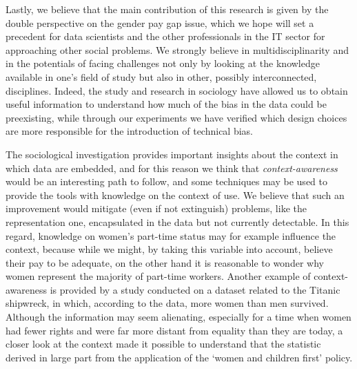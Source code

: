 Lastly, we believe that the main contribution of this research is given by the double perspective on the gender pay gap issue, which we hope will set a precedent for data scientists and the other professionals in the IT sector for approaching other social problems. We strongly believe in multidisciplinarity and in the potentials of facing challenges not only by looking at the knowledge available in one's field of study but also in other, possibly interconnected, disciplines. Indeed, the study and research in sociology have allowed us to obtain useful information to understand how much of the bias in the data could be preexisting, while through our experiments we have verified which design choices are more responsible for the introduction of technical bias.

The sociological investigation provides important insights about the context in which data are embedded, and for this reason we think that \textit{context-awareness} would be an interesting path to follow, and some techniques may be used to provide the tools with knowledge on the context of use. We believe that such an improvement would mitigate (even if not extinguish) problems, like the representation one, encapsulated in the data but not currently detectable. In this regard, knowledge on women's part-time status may for example influence the context, because while we might, by taking this variable into account, believe their pay to be adequate, on the other hand it is reasonable to wonder why women represent the majority of part-time workers. Another example of context-awareness is provided by a study conducted on a dataset related to the Titanic shipwreck, in which, according to the data, more women than men survived. Although the information may seem alienating, especially for a time when women had fewer rights and were far more distant from equality than they are today, a closer look at the context made it possible to understand that the statistic derived in large part from the application of the `women and children first' policy.

